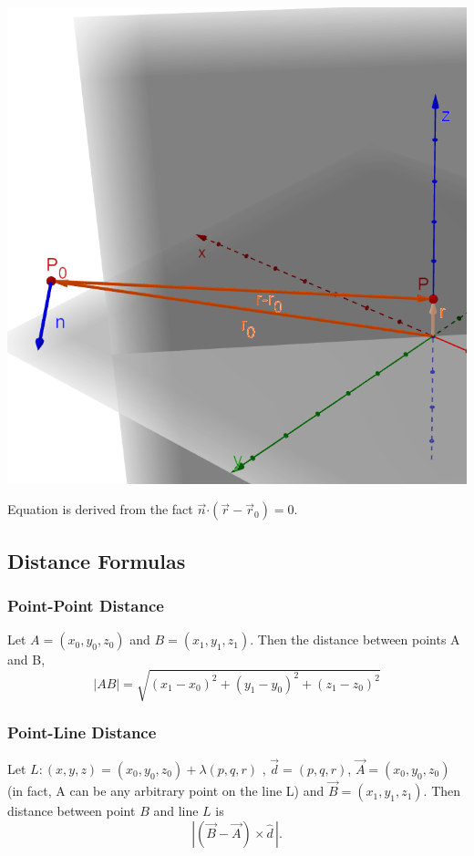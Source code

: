 \documentclass[12pt]{article}
\newcommand{\dotp}{{\boldsymbol \cdot}}
\begin{document}
\includegraphics[scale=0.7]{plane.png}

Equation is derived from the fact $\vec n \dotp (\vec r - \vec r_0)=0$.
\newpage
\subsection{Distance Formulas}
\subsubsection{Point-Point Distance}
Let $ A =(x_0,y_0,z_0)$ and $B= (x_1,y_1,z_1)$. Then the distance between points A and B, $$|AB|= \sqrt{(x_1-x_0)^2+(y_1-y_0)^2+(z_1-z_0)^2}$$
\subsubsection{Point-Line Distance}
Let $L: (x,y,z) = (x_0,y_0,z_0) + \lambda (p,q,r)$ , $\vec d = (p,q,r)$, $\vec A=(x_0,y_0,z_0)$ (in fact, A can be any arbitrary point on the line L) and $\vec B=(x_1,y_1,z_1)$. Then distance between point $B$ and line $L$ is $$|(\vec B - \vec A)\times \hat d\,|.$$
\end{document}
